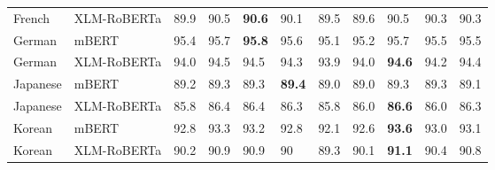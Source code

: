 \begin{tabular}{llrlllrrlrl}
           French &    XLM-RoBERTa &           89.9 &         90.5 &   \textbf{90.6} &           90.1 &           89.5 &            89.6 &          90.5 &          90.3 &         90.3 \\
           German &          mBERT &           95.4 &         95.7 &   \textbf{95.8} &           95.6 &           95.1 &            95.2 &          95.7 &          95.5 &         95.5 \\
           German &    XLM-RoBERTa &           94.0 &         94.5 &         94.5 &           94.3 &           93.9 &            94.0 &    \textbf{94.6} &          94.2 &         94.4 \\
         Japanese &          mBERT &           89.2 &         89.3 &         89.3 &     \textbf{89.4} &           89.0 &            89.0 &          89.3 &          89.3 &         89.1 \\
         Japanese &    XLM-RoBERTa &           85.8 &         86.4 &         86.4 &           86.3 &           85.8 &            86.0 &    \textbf{86.6} &          86.0 &         86.3 \\
           Korean &          mBERT &           92.8 &         93.3 &         93.2 &           92.8 &           92.1 &            92.6 &    \textbf{93.6} &          93.0 &         93.1 \\
           Korean &    XLM-RoBERTa &           90.2 &         90.9 &         90.9 &             90 &           89.3 &            90.1 &    \textbf{91.1} &          90.4 &         90.8 \\
\bottomrule
\end{tabular}
